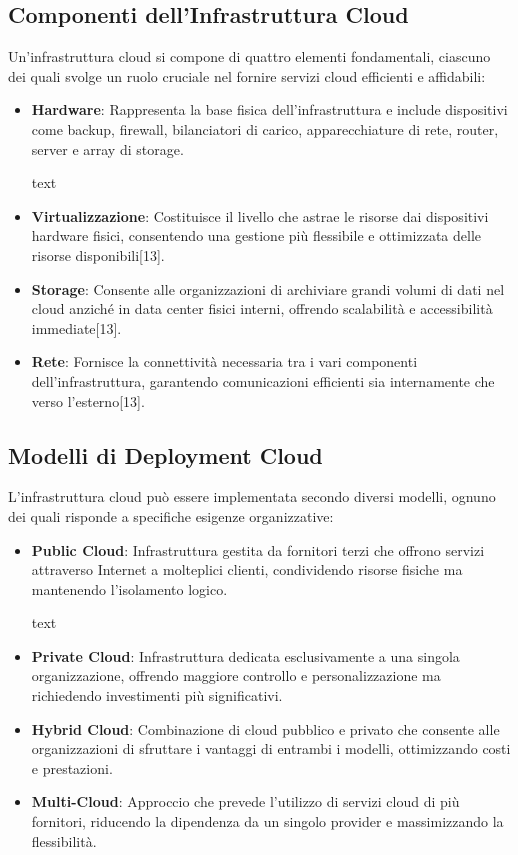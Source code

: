 \documentclass[a4paper,12pt]{report}
\begin{document}
\subsection{Componenti dell'Infrastruttura Cloud}

Un'infrastruttura cloud si compone di quattro elementi fondamentali, ciascuno dei quali svolge un ruolo cruciale nel fornire servizi cloud efficienti e affidabili:

\begin{itemize}
\item \textbf{Hardware}: Rappresenta la base fisica dell'infrastruttura e include dispositivi come backup, firewall, bilanciatori di carico, apparecchiature di rete, router, server e array di storage.

text
\item \textbf{Virtualizzazione}: Costituisce il livello che astrae le risorse dai dispositivi hardware fisici, consentendo una gestione più flessibile e ottimizzata delle risorse disponibili[13].

\item \textbf{Storage}: Consente alle organizzazioni di archiviare grandi volumi di dati nel cloud anziché in data center fisici interni, offrendo scalabilità e accessibilità immediate[13].

\item \textbf{Rete}: Fornisce la connettività necessaria tra i vari componenti dell'infrastruttura, garantendo comunicazioni efficienti sia internamente che verso l'esterno[13].
\end{itemize}

\subsection{Modelli di Deployment Cloud}

L'infrastruttura cloud può essere implementata secondo diversi modelli, ognuno dei quali risponde a specifiche esigenze organizzative:

\begin{itemize}
\item \textbf{Public Cloud}: Infrastruttura gestita da fornitori terzi che offrono servizi attraverso Internet a molteplici clienti, condividendo risorse fisiche ma mantenendo l'isolamento logico.

text
\item \textbf{Private Cloud}: Infrastruttura dedicata esclusivamente a una singola organizzazione, offrendo maggiore controllo e personalizzazione ma richiedendo investimenti più significativi.

\item \textbf{Hybrid Cloud}: Combinazione di cloud pubblico e privato che consente alle organizzazioni di sfruttare i vantaggi di entrambi i modelli, ottimizzando costi e prestazioni.

\item \textbf{Multi-Cloud}: Approccio che prevede l'utilizzo di servizi cloud di più fornitori, riducendo la dipendenza da un singolo provider e massimizzando la flessibilità.
\end{itemize}
\end{document}
